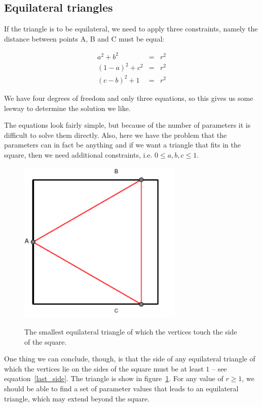 \documentclass[onecolumn]{article}
\begin{document}
\subsection*{Equilateral triangles}
If the triangle is to be equilateral, we need to apply three constraints, namely the distance between
points A, B and C must be equal:

\begin{eqnarray}
  a^2 + b^2 &=& r^2 \\
  (1-a)^2 + c^2 &=& r^2 \\
\label{last_side} (c-b)^2 + 1 &=& r^2
\end{eqnarray}

We have four degrees of freedom and only three equations, so this gives us some leeway to determine the solution we like.

The equations look fairly simple, but because of the number of parameters it is difficult to solve them directly. Also,
here we have the problem that the parameters can in fact be anything and if we want a triangle that fits in the square,
then we need additional constraints, i.e. $0 \le a, b, c \le 1$.

\begin{figure}[h]
\begin{center}
\caption{The smallest equilateral triangle of which the vertices touch the side of the square.}
\includegraphics[width=0.7\textwidth]{triangle_smallest.pdf}
\label{triangle_smallest}
\end{center}
\end{figure}

One thing we can conclude, though, is that the side of any equilateral triangle of which the vertices lie on the sides of
the square must be at least $1$ -- see equation~\ref{last_side}. The triangle is show in figure~\ref{triangle_smallest}.
For any value of $r \ge 1$, we should be able to find
a set of parameter values that leads to an equilateral triangle, which may extend beyond the square.
\end{document}
